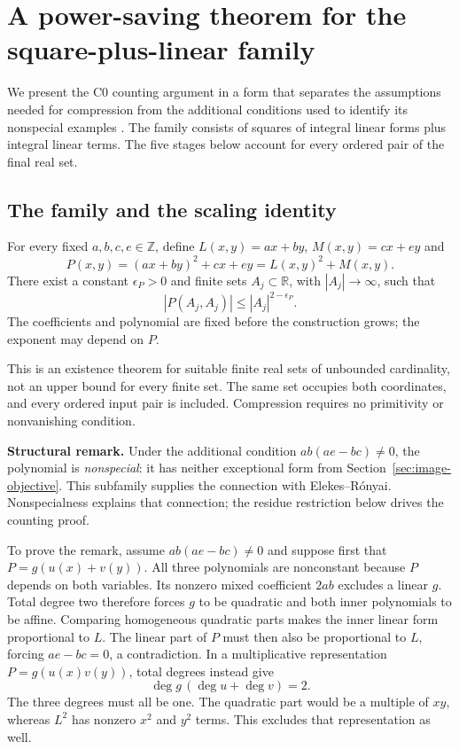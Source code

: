 \section{A power-saving theorem for the square-plus-linear family}
\label{sec:quadratic}

We present the C0 counting argument in a form that separates the assumptions needed for compression from the additional conditions used to identify its nonspecial examples \cite[Theorem C0.1 and \S{}\S{}4--6]{ref10}. The family consists of squares of integral linear forms plus integral linear terms. The five stages below account for every ordered pair of the final real set.

\subsection{The family and the scaling identity}
\label{subsec:quadratic-family}

\begin{theorem}
\label{thm:quadratic-compression}
For every fixed $a,b,c,e\in\mathbb Z$, define $L(x,y)=ax+by$, $M(x,y)=cx+ey$ and
\[
P(x,y)=(ax+by)^2+cx+ey=L(x,y)^2+M(x,y).
\]
There exist a constant $\epsilon_P>0$ and finite sets $A_j\subset\mathbb R$, with $|A_j|\to\infty$, such that
\begin{equation}
|P(A_j,A_j)|\le |A_j|^{2-\epsilon_P}.
\label{eq:quadratic-target}
\end{equation}
The coefficients and polynomial are fixed before the construction grows; the exponent may depend on $P$.
\end{theorem}

This is an existence theorem for suitable finite real sets of unbounded cardinality, not an upper bound for every finite set. The same set occupies both coordinates, and every ordered input pair is included. Compression requires no primitivity or nonvanishing condition.

\textbf{Structural remark.} Under the additional condition $ab(ae-bc)\ne0$, the polynomial is \emph{nonspecial}: it has neither exceptional form from Section~\ref{sec:image-objective}. This subfamily supplies the connection with Elekes--R\'onyai. Nonspecialness explains that connection; the residue restriction below drives the counting proof.

To prove the remark, assume $ab(ae-bc)\ne0$ and suppose first that $P=g(u(x)+v(y))$. All three polynomials are nonconstant because $P$ depends on both variables. Its nonzero mixed coefficient $2ab$ excludes a linear $g$. Total degree two therefore forces $g$ to be quadratic and both inner polynomials to be affine. Comparing homogeneous quadratic parts makes the inner linear form proportional to $L$. The linear part of $P$ must then also be proportional to $L$, forcing $ae-bc=0$, a contradiction. In a multiplicative representation $P=g(u(x)v(y))$, total degrees instead give
\[
\deg g\,(\deg u+\deg v)=2.
\]
The three degrees must all be one. The quadratic part would be a multiple of $xy$, whereas $L^2$ has nonzero $x^2$ and $y^2$ terms. This excludes that representation as well.

